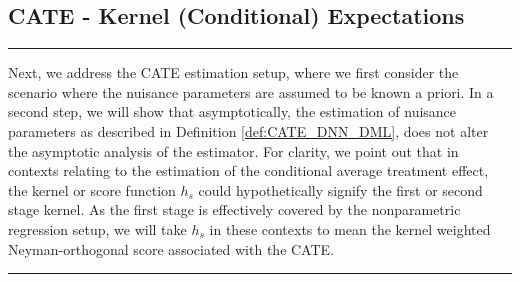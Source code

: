 \subsection{CATE - Kernel (Conditional) Expectations}
\hrule
Next, we address the CATE estimation setup, where we first consider the scenario where the nuisance parameters are assumed to be known a priori.
In a second step, we will show that asymptotically, the estimation of nuisance parameters as described in Definition \ref{def:CATE_DNN_DML}, does not alter the asymptotic analysis of the estimator.
For clarity, we point out that in contexts relating to the estimation of the conditional average treatment effect, the kernel or score function $h_s$ could hypothetically signify the first or second stage kernel.
As the first stage is effectively covered by the nonparametric regression setup, we will take $h_s$ in these contexts to mean the kernel weighted Neyman-orthogonal score associated with the CATE.
\vspace{0.5cm}
\hrule

